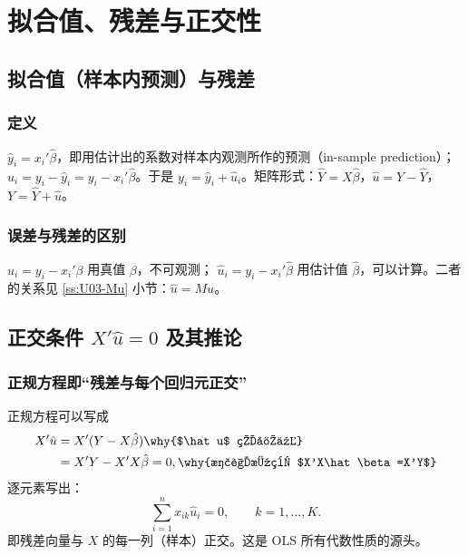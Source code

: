 \section{拟合值、残差与正交性}\label{sec:U03-resid}

\subsection{拟合值（样本内预测）与残差}

\subsubsection{定义}

\begin{defn}[拟合值与残差]\label{def:U03-fitted}
 $\hat y_i=x_i'\hat\beta$，即用估计出的系数对样本内观测所作的预测（in-sample prediction）； $\hat u_i=y_i-\hat y_i=y_i-x_i'\hat\beta$。于是 $y_i=\hat y_i+\hat u_i$。矩阵形式：$\hat Y=X\hat\beta$，$\hat u=Y-\hat Y$，$Y=\hat Y+\hat u$。
\end{defn}

\subsubsection{误差与残差的区别}

 $u_i=y_i-x_i'\beta$ 用真值 $\beta$，不可观测； $\hat u_i=y_i-x_i'\hat\beta$ 用估计值 $\hat\beta$，可以计算。二者的关系见 \ref{ss:U03-Mu} 小节：$\hat u=Mu$。

\subsection{正交条件 \texorpdfstring{$X'\hat u=0$}{X'u-hat = 0} 及其推论}

\subsubsection{正规方程即“残差与每个回归元正交”}

正规方程可以写成
\begin{align*}
X'\hat u &= X'(Y-X\hat\beta) \why{$\hat u$ 的定义}\\
&= X'Y-X'X\hat\beta=0, \why{正规方程 $X'X\hat\beta=X'Y$}
\end{align*}
逐元素写出：
\begin{equation}\label{eq:U03-orth}
\sum_{i=1}^n x_{ik}\hat u_i=0,\qquad k=1,\dots,K .
\end{equation}
即残差向量与 $X$ 的每一列（样本）正交。这是 OLS 所有代数性质的源头。

